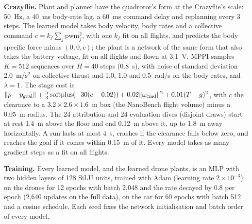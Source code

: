 \documentclass[preprint,12pt]{elsarticle}
\begin{document}
\textbf{Crazyflie.} Plant and planner have the quadrotor's form at the Crazyflie's scale: 50~Hz, a 40~ms body-rate lag, a 60~ms command delay and replanning every 3 steps. The learned model takes body velocity, body rates and a collective command $c=k_f\sum_j\mathrm{pwm}_j^2$, with one $k_f$ fit on all flights, and predicts the body specific force minus $(0,0,c)$; the plant is a network of the same form that also takes the battery voltage, fit on all flights and flown at 3.1~V. MPPI samples $K=512$ sequences over $H=40$ steps (0.8~s), with noise of standard deviation 2.0~m/s$^2$ on collective thrust and 1.0, 1.0 and 0.5~rad/s on the body rates, and $\lambda=1$. The stage cost is $\|p-p_{\rm goal}\|+\frac53\,\mathrm{softplus}(-30(c-0.02))+0.02\|\omega_{\rm cmd}\|^2+0.01(T-g)^2$, with $c$ the clearance to a $3.2\times2.6\times1.6$~m box (the NanoBench flight volume) minus a 0.05~m radius. The 24 attribution and 24 evaluation dives (disjoint draws) start at rest 1.4~m above the floor and end 0.12~m above it, up to 1.8~m away horizontally. A run lasts at most 4~s, crashes if the clearance falls below zero, and reaches the goal if it comes within 0.15~m of it. Every model takes as many gradient steps as a fit on all flights.

\textbf{Training.} Every learned model, and the learned drone plants, is an MLP with two hidden layers of 128 SiLU units, trained with Adam (learning rate $2\times10^{-3}$): on the drones for 12 epochs with batch 2,048 and the rate decayed by 0.8 per epoch (2,640 updates on the full data), on the car for 60 epochs with batch 512 and a cosine schedule. Each seed fixes the network initialisation and batch order of every model.
\end{document}
